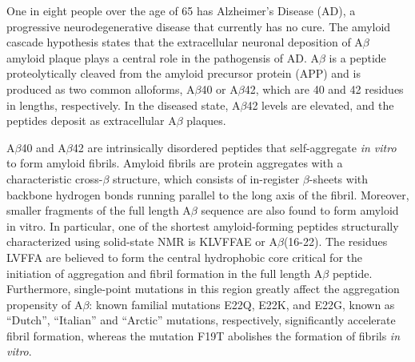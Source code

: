One in eight people over the age of 65 has Alzheimer's Disease (AD), a progressive neurodegenerative disease that currently has no cure.\cite{Citron:2010p214} The amyloid cascade hypothesis states that the extracellular neuronal deposition of A$\beta$ amyloid plaque plays a central role in the pathogensis of AD.\cite{Solomon:2010p177} A$\beta$ is a peptide proteolytically cleaved from the amyloid precursor protein (APP) and is produced as two common alloforms, A$\beta$40 or A$\beta$42, which are 40 and 42 residues in lengths, respectively. In the diseased state, A$\beta$42 levels are elevated, and the peptides deposit as extracellular A$\beta$ plaques.\cite{Haass:2007p226,Citron:1997p228}

A$\beta$40 and A$\beta$42 are intrinsically disordered peptides that self-aggregate \emph{in vitro} to form amyloid fibrils. Amyloid fibrils are protein aggregates with a characteristic cross-$\beta$ structure, which consists of in-register $\beta$-sheets with backbone hydrogen bonds running parallel to the long axis of the fibril.\cite{Petkova:2002p192} Moreover, smaller fragments of the full length A$\beta$ sequence are also found to form amyloid in vitro.\cite{Balbach:2000p49,Sawaya:2007p11} In particular, one of the shortest amyloid-forming peptides structurally characterized using solid-state NMR is KLVFFAE or A$\beta$(16-22).\cite{Balbach:2000p49} The residues LVFFA are believed to form the central hydrophobic core critical for the initiation of aggregation and fibril formation in the full length A$\beta$ peptide.\cite{Wood:1995p190} Furthermore, single-point mutations in this region greatly affect the aggregation propensity of A$\beta$: known familial mutations E22Q, E22K, and E22G, known as ``Dutch'', ``Italian'' and ``Arctic'' mutations, respectively, significantly accelerate fibril formation,\cite{Kim:2008ef} whereas the mutation F19T abolishes the formation of fibrils \emph{in vitro}.\cite{Esler:1996p288}


